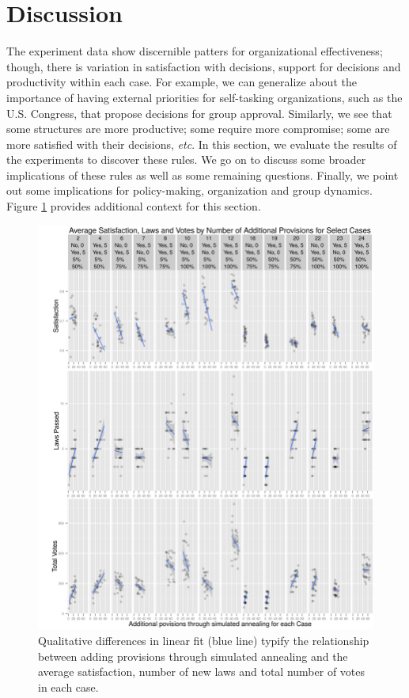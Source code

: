 \documentclass[pdftex,12pt]{llncs}
\begin{document}
\section{Discussion}
%
The experiment data show discernible patters for organizational effectiveness; though, there is variation in satisfaction with decisions, support for decisions and productivity within each case.
For example, we can generalize about the importance of having external priorities for self-tasking organizations, such as the U.S. Congress, that propose decisions for group approval. 
Similarly, we see that some structures are more productive; some require more compromise; some are more satisfied with their decisions, \textit{etc}. 
In this section, we evaluate the results of the experiments to discover these rules. 
We go on to discuss some broader implications of these rules as well as some remaining questions.
Finally, we point out some implications for policy-making, organization and group dynamics. 
Figure \ref{combined} provides additional context for this section.

\begin{figure}[h!]
\centering
\includegraphics[width=4.75in]{combinedCases_crop.pdf}
\caption[ ]{Qualitative differences in linear fit (blue line) typify the relationship between adding provisions through simulated annealing and the average satisfaction, number of new laws and total number of votes in each case.} 
\label{combined}
\end{figure}
\end{document}
